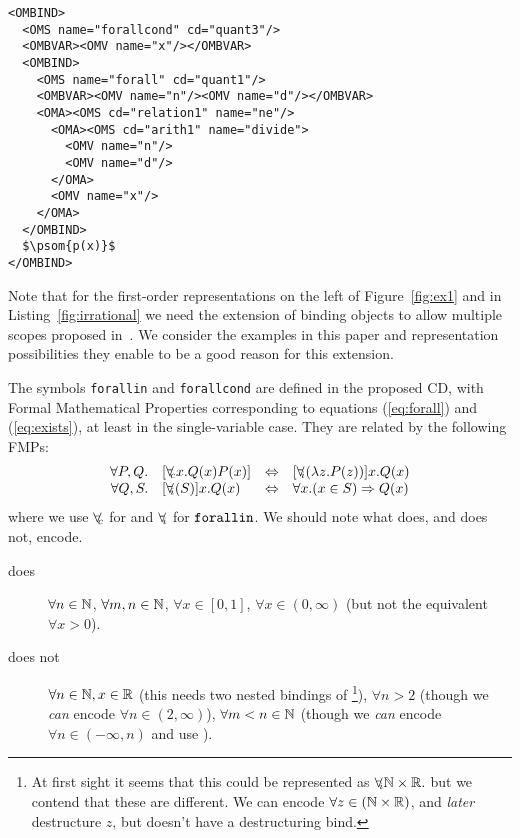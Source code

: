 \documentclass{llncs}
\def\forallin{\forall_{\kern-.25em i}}
\def\forallcond{\forall_{\kern-.25em c}}
\begin{document}
\begin{lstlisting}[caption=A natural case for a quantifier with a condition,label=fig:irrational,mathescape]
<OMBIND>
  <OMS name="forallcond" cd="quant3"/>
  <OMBVAR><OMV name="x"/></OMBVAR>
  <OMBIND>
    <OMS name="forall" cd="quant1"/>
    <OMBVAR><OMV name="n"/><OMV name="d"/></OMBVAR>
    <OMA><OMS cd="relation1" name="ne"/>
      <OMA><OMS cd="arith1" name="divide">
        <OMV name="n"/>
        <OMV name="d"/>
      </OMA>
      <OMV name="x"/>
    </OMA>
  </OMBIND>
  $\psom{p(x)}$
</OMBIND>
\end{lstlisting}
Note that for the first-order representations on the left of Figure~\ref{fig:ex1} and in
Listing~\ref{fig:irrational} we need the extension of binding objects to allow multiple
scopes proposed in~\cite{DavenportKohlhase2009a}. We consider the examples in this paper
and representation possibilities they enable to be a good reason for this extension.

The symbols {\texttt{forallin}} and {\texttt{forallcond}} are defined in the proposed
{} CD, with Formal Mathematical Properties corresponding to equations
(\ref{eq:forall}) and (\ref{eq:exists}), at least in the single-variable case. They are
related by the following FMPs:
\[\begin{array}{rlcl}
  \forall P,Q.&[\forallcond x.Q(x) P(x)] &\Leftrightarrow& [\forallin(\lambda{z}.P(z))]x.Q(x)\\
  \forall Q,S.&[\forallin(S)]x.Q(x) & \Leftrightarrow & \forall x. (x\in
S)\Rightarrow Q(x) 
\end{array}\]
where we use $\forallcond$ for
{} and $\forallin$ for $\texttt{forallin}$. We should note what {} does, and does not, encode.
\begin{description}
\item[does]$\forall n\in\mathbb{N}$, $\forall m,n\in\mathbb{N}$, $\forall x\in[0,1]$, $\forall
  x\in(0,\infty)$ (but not the equivalent $\forall x>0$).
\item[does not]$\forall n\in\mathbb{N},x \in\mathbb{R}$ (this needs two nested bindings of
  {}\footnote{At first sight it seems that this could be represented as
    $\forallin{\N\times\R}.$ but we contend that these are different. We can encode
    $\forall z\in(\mathbb{N}\times\mathbb{R})$, and {\emph{later}} destructure $z$, but 
{\openmath} doesn't have a
    destructuring bind.}), $\forall n>2$ (though we {\emph{can}} encode $\forall n \in
  (2,\infty)$), $\forall m<n\in\mathbb{N}$ (though we {\emph{can}} encode $\forall
  n\in(-\infty,n)$ and use {}).
\end{description}
\end{document}
